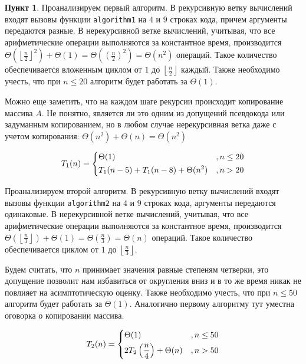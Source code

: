 \documentclass[11pt,a4paper]{scrarticle}
\theoremstyle{definition}
\newtheorem{subtask}{Пункт}
\newcommand{\floor}[1]{\left\lfloor #1 \right\rfloor}
\begin{document}
\begin{subtask}
	Проанализируем первый алгоритм. В рекурсивную ветку вычислений входят вызовы функции \texttt{algorithm1} на $4$ и $9$ строках кода, причем аргументы передаются разные.
	В нерекурсивной ветке вычислений, учитывая, что все арифметические операции выполняются за константное время, производится $\Theta\left(\floor{\frac{n}{2}}^2\right) + \Theta(1) = \Theta\left(\left(\frac{n}{2}\right)^2\right) = \Theta(n^2)$ операций. Такое количество обеспечивается вложенным циклом от $1$ до $\floor{\frac{n}{2}}$ каждый.
	Также необходимо учесть, что при $n \leq 20$ алгоритм будет работать за $\Theta(1)$.

	Можно еще заметить, что на каждом шаге рекурсии происходит копирование массива $A$. Не понятно, является ли это одним из допущений псевдокода или задуманным копированием, но в любом случае нерекурсивная ветка даже с учетом копирования: $\Theta(n^2) + \Theta(n) = \Theta(n^2)$

	\begin{equation}
		\label{eqn:t1}
		T_1(n) = \begin{dcases}
			\Theta(1)                             & , n \leq 20 \\
			T_1(n - 5) + T_1(n - 8) + \Theta(n^2) & , n > 20
		\end{dcases}
	\end{equation}

	Проанализируем второй алгоритм. В рекурсивную ветку вычислений входят вызовы функции \texttt{algorithm2} на $4$ и $9$ строках кода, аргументы передаются одинаковые.
	В нерекурсивной ветке вычислений, учитывая, что все арифметические операции выполняются за константное время, производится $\Theta\left(\floor{\frac{n}{3}}\right) + \Theta(1) = \Theta\left(\frac{n}{3}\right) = \Theta(n)$ операций. Такое количество обеспечивается циклом от $1$ до $\floor{\frac{n}{3}}$.

	Будем считать, что $n$ принимает значения равные степеням четверки, это допущение позволит нам избавиться от округления вниз и в то же время никак не повлияет на асимптотическую оценку.
	Также необходимо учесть, что при $n \leq 50$ алгоритм будет работать за $\Theta(1)$.
	Аналогично первому алгоритму тут уместна оговорка о копировании массива.

	\begin{equation}
		\label{eqn:t2}
		T_2(n) = \begin{dcases}
			\Theta(1)                                & , n \leq 50 \\
			2T_2\left(\frac{n}{4}\right) + \Theta(n) & , n > 50
		\end{dcases}
	\end{equation}
\end{subtask}
\end{document}
